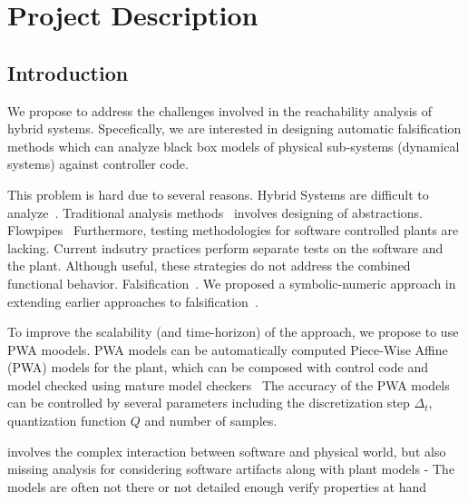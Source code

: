 \section{Project Description}

%
%
%

\subsection{Introduction}


We propose to address the challenges involved in the reachability
analysis of hybrid systems. Specefically, we are interested in
designing automatic falsification methods which can analyze black box
models of physical sub-systems (dynamical systems) against controller
code.

This problem is hard due to several reasons. Hybrid Systems are
difficult to analyze~\cite{henzinger1995s}. Traditional analysis methods~\cite{alur2000discrete,} involves
designing of abstractions.
Flowpipes~\cite{Chen2012taylor,
Frehse+Others/2011/SpaceEx, althoff2016combining,}
Furthermore, testing methodologies for
software controlled plants are lacking. Current indsutry practices
perform separate tests on the software and the plant. Although useful,
these strategies do not address the combined functional behavior.
Falsification~\cite{annpureddy2011s, donze2010breach}.
We
proposed a symbolic-numeric approach in~\cite{zutshi2016symbolic}
extending earlier approaches to falsification~\cite{majumdar2012clse}.

To improve the scalability (and time-horizon) of the approach, we
propose to use PWA moodels. PWA models can be automatically computed
Piece-Wise Affine (PWA) models for the plant, which can be composed
with control code and model checked using mature model
checkers~\cite{CBMC,}
The accuracy of the PWA models can be controlled by several parameters
including the discretization step $\Delta_t$, quantization function
$Q$ and number of samples.


involves the complex
interaction between software and physical world, but also missing
analysis for considering software artifacts along with plant models
- The models are often not there or not detailed enough verify
properties at hand

